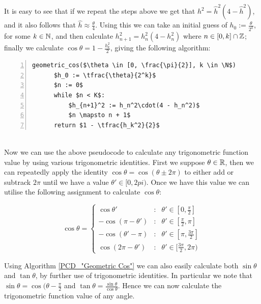 It is easy to see that if we repeat the steps above we get that \(h^2 = \hat{h}^2(4 - \hat{h}^2)\), and it also follows that \(\hat{h} \approx \frac{\theta}{4}\). Using this we can take an initial guess of \(h_0 := \frac{\theta}{2^k}\), for some \(k \in \mathbb{N}\), and then calculate \(h_{n+1}^2 = h_n^2(4 - h_n^2)\) where \(n \in [0, k] \cap \mathbb{Z}\); finally we calculate \(\cos\theta = 1 - \frac{h_k^2}{2}\), giving the following algorithm:
  
\begin{lstlisting}[numbers=left,frame=single,mathescape,caption={Geometric calculation of \(\cos\)},label={PCD_"Geometric Cos"}]
  geometric_cos($\theta \in [0, \frac{\pi}{2}], k \in \N$)
      $h_0 := \tfrac{\theta}{2^k}$
      $n := 0$
      while $n < K$:
          $h_{n+1}^2 := h_n^2\cdot(4 - h_n^2)$
          $n \mapsto n + 1$
      return $1 - \tfrac{h_k^2}{2}$
\end{lstlisting}\\

Now we can use the above pseudocode to calculate any trigonometric function value by using various trigonometric identities. First we  suppose \(\theta \in \mathbb{R}\), then we can repeatedly apply the identity \(\cos\theta = \cos(\theta \pm 2\pi)\) to either add or subtrack \(2\pi\) until we have a value \(\theta' \in [0, 2pi)\). Once we have this value we can utilise the following assignment to calculate \(\cos\theta\):

\begin{displaymath}
	\cos\theta = \left\{ \begin{array}{lcl}
			\cos\theta' & : & \theta' \in [0, \frac{\pi}{2}]\\
			-\cos(\pi - \theta') & : & \theta' \in [\frac{\pi}{2}, \pi]\\
			-\cos(\theta' - \pi) & : & \theta' \in [\pi, \frac{3\pi}{2}]\\
			\cos(2\pi - \theta') & : & \theta' \in [\frac{3\pi}{2}, 2\pi)
		\end{array}\right.
\end{displaymath}

Using Algorithm \ref{PCD_"Geometric Cos"} we can also easily calculate both \(\sin\theta\) and \(\tan\theta\), by further use of trigonometric identities. In particular we note that \(\sin\theta = \cos(\theta - \frac{\pi}{2}\) and \(\tan\theta = \frac{\sin\theta}{\cos\theta}\). Hence we can now calculate the trigonometric function value of any angle.\\

